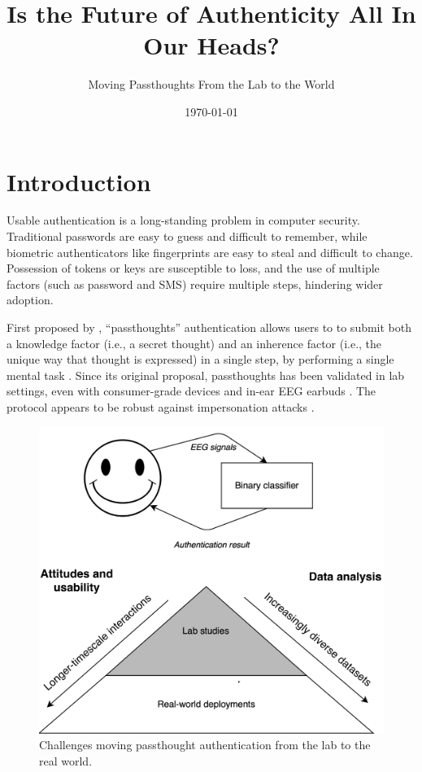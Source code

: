 \documentclass[sigconf]{acmart}
\date{\today}
\title{Is the Future of Authenticity All In Our Heads?}
\begin{document}
\maketitle
\subtitle{Moving Passthoughts From the Lab to the World}

\section{Introduction}
\label{sec:org643f242}

Usable authentication is a long-standing problem in computer security.
Traditional passwords are easy to guess and difficult to remember, while
biometric authenticators like fingerprints are easy to steal and difficult to
change. Possession of tokens or keys are susceptible to loss, and the use of
multiple factors (such as password and SMS) require multiple steps, hindering
wider adoption.

First proposed by \cite{Thorpe2005}, ``passthoughts'' authentication allows users
to to submit both a knowledge factor (i.e., a secret thought) and an inherence
factor (i.e., the unique way that thought is expressed) in a single step, by
performing a single mental task \cite{Johnson2014}. Since its original proposal,
passthoughts has been validated in lab settings, even with consumer-grade
devices \cite{Chuang2013b} and in-ear EEG earbuds \cite{curranpassthoughts}. The
protocol appears to be robust against impersonation attacks \cite{Johnson2014}.

\label{fig:diagram}
\begin{figure}[htbp]
\centering
\includegraphics[width=.9\linewidth]{./figures/passthoughts-diagram.png}
\caption{Challenges moving passthought authentication from the lab to the real world.}
\end{figure}
\end{document}
